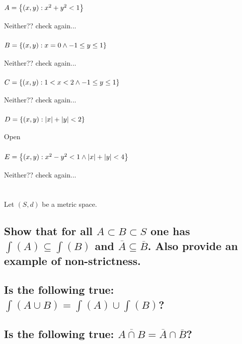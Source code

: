 \documentclass[]{article}
\begin{document}
\subsubsection{$A = \qty{(x,y) : x^2 + y^2 < 1}$}
Neither?? check again...
\subsubsection{$B = \qty{(x,y) : x = 0 \land -1 \leq y \leq 1}$}
Neither?? check again...
\subsubsection{$C = \qty{(x,y) : 1 < x < 2 \land -1 \leq y \leq 1}$}
Neither?? check again...
\subsubsection{$D = \qty{(x,y) : \abs{x} + \abs{y} < 2}$}
Open
\subsubsection{$E = \qty{(x,y) : x^2 - y^2 < 1 \land \abs{x} + \abs{y} < 4}$}
Neither?? check again...



\newpage
\section{}
Let $(S,d)$ be a metric space.
\subsection{Show that for all $A \subset B \subset S$ 
one has $\int(A)\subseteq \int(B)$ and $\overline{A}\subseteq\overline{B}$. 
Also provide an example of non-strictness.}





\subsection{Is the following true:
$\int(A\cup B) = \int(A) \cup \int(B)$?}





\subsection{Is the following true:
$\overline{A\cap B} = \overline{A} \cap \overline{B}$?}
\end{document}
